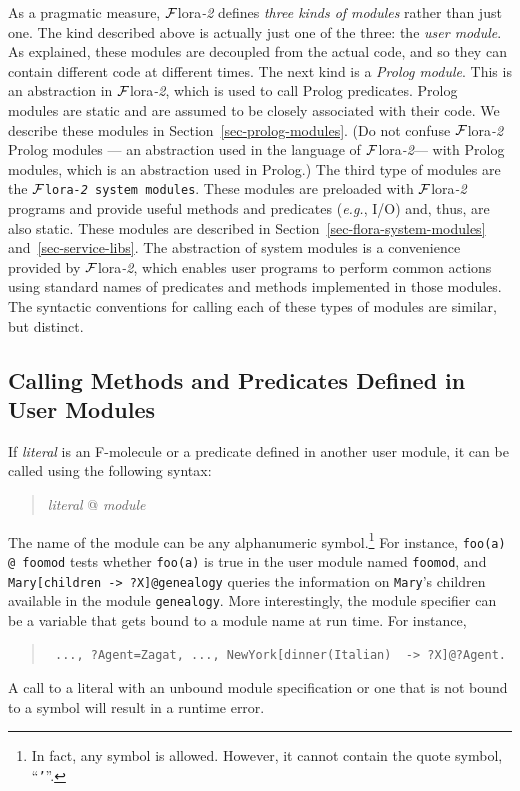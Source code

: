 \documentclass[11pt]{article}
\newcommand{\mvd}{{\mbox{\tt \,->\,}}}  %
\newcommand{\FLORA}{{\mbox{\sc ${\cal F}${lora}\rm\emph{-2}}}\xspace}
\begin{document}
As a pragmatic measure, \FLORA defines \emph{three kinds of modules} rather
than just one. The kind described above is actually just one of the three:
the \emph{user module}. As explained, these modules are decoupled from the
actual code, and so they can contain different code at different times.
The next kind is a \emph{Prolog module}. This is an abstraction in \FLORA,
which is used to call Prolog predicates. Prolog modules are static and are
assumed to be closely associated with their code. We describe these modules
in Section~\ref{sec-prolog-modules}. (Do not confuse \FLORA Prolog modules
--- an abstraction used in the language of \FLORA --- with Prolog modules,
which is an abstraction used in Prolog.)  The third type of modules are the
{\tt \FLORA system modules}. These modules are preloaded with \FLORA
programs and provide useful methods and predicates ({\it e.g.}, I/O) and,
thus, are also static. These modules are described in
Section~\ref{sec-flora-system-modules} and~\ref{sec-service-libs}. The
abstraction of system modules is a convenience provided by \FLORA, which
enables user programs to perform common actions using standard names of
predicates and methods implemented in those modules. The syntactic
conventions for calling each of these types of modules are similar, but
distinct.


\subsection{Calling Methods and Predicates Defined in User Modules}


%
If \emph{literal} is an F-molecule or a predicate defined in another
user module, it can be called using the following syntax:
\begin{quote}
\emph{literal} @ \emph{module} 
\end{quote}
The name of the module can be any alphanumeric symbol.\footnote{
  In fact, any symbol is allowed. However, it cannot contain the quote
  symbol, ``{\tt '}''.
  }
For instance, \verb|foo(a) @ foomod| tests whether {\tt foo(a)} is true in
the user module named {\tt foomod}, and {\tt Mary[children\mvd ?X]@genealogy}
queries the information on {\tt Mary}'s children available in the module
{\tt genealogy}. More interestingly, the module specifier can be a variable
that gets bound to a module name at run time. For instance, 
\begin{quote}
 {\tt
   ..., ?Agent=Zagat, ..., NewYork[dinner(Italian) \mvd ?X]@?Agent.
   }
\end{quote}
A call to a literal with an unbound module specification or one that is not
bound to a symbol will result in a runtime error.
\end{document}
